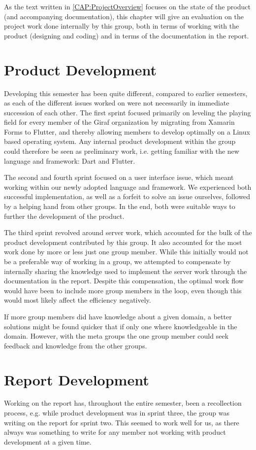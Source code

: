 As the text written in \autoref{CAP:ProjectOverview} focuses on the state of the product (and accompanying documentation), this chapter will give an evaluation on the project work done internally by this group, both in terms of working with the product (designing and coding) and in terms of the documentation in the report.

\section{Product Development}
Developing this semester has been quite different, compared to earlier semesters, as each of the different issues worked on were not necessarily in immediate succession of each other.
The first sprint focused primarily on leveling the playing field for every member of the Giraf organization by migrating from Xamarin Forms to Flutter, and thereby allowing members to develop optimally on a Linux based operating system.
Any internal product development within the group could therefore be seen as preliminary work, i.e. getting familiar with the new language and framework: Dart and Flutter.


The second and fourth sprint focused on a user interface issue, which meant working within our newly adopted language and framework.
We experienced both successful implementation, as well as a forfeit to solve an issue ourselves, followed by a helping hand from other groups.
In the end, both were suitable ways to further the development of the product.

The third sprint revolved around server work, which accounted for the bulk of the product development contributed by this group.
It also accounted for the most work done by more or less just one group member.
While this initially would not be a preferable way of working in a group, we attempted to compensate by internally sharing the knowledge used to implement the server work through the documentation in the report.
Despite this compensation, the optimal work flow would have been to include more group members in the loop, even though this would most likely affect the efficiency negatively.

If more group members did have knowledge about a given domain, a better solutions might be found quicker that if only one where knowledgeable in the domain.
However, with the meta groups the one group member could seek feedback and knowledge from the other groups.

\section{Report Development}
Working on the report has, throughout the entire semester, been a recollection process, e.g. while product development was in sprint three, the group was writing on the report for sprint two.
This seemed to work well for us, as there always was something to write for any member not working with product development at a given time.

